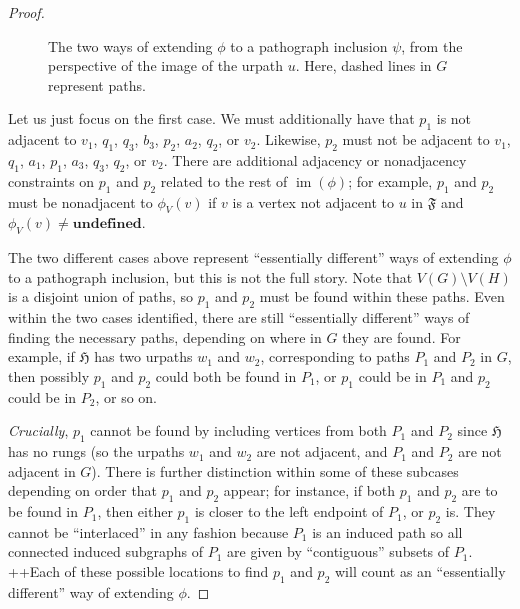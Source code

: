 \documentclass{article}
\newcommand{\alabvert}[4]{\node[dot, label={[label distance=-2pt] #4:{$#3$}}] (#1) at (#2) {};}
\newcommand{\labdotedge}[4]{\draw[dashed] (#1) -- node[midway, #4] {$#3$} (#2);}
\newcommand{\Ff}{\mathfrak{F}}
\newcommand{\Hf}{\mathfrak{H}}
\newcommand{\ud}{\mathbf{undefined}}
\DeclareMathOperator{\im}{im}
\begin{document}
\begin{proof}
\begin{figure}[htbp!]
    \caption{The two ways of extending $\phi$ to a pathograph inclusion $\psi$, from the perspective of the image of the urpath $u$. Here, dashed lines in $G$ represent paths.}
    \label{fig:partialpath}
\end{figure}

Let us just focus on the first case. We must additionally have that $p_1$ is not adjacent to $v_1$, $q_1$, $q_3$, $b_3$, $p_2$, $a_2$, $q_2$, or $v_2$. Likewise, $p_2$ must not be adjacent to $v_1$, $q_1$, $a_1$, $p_1$, $a_3$, $q_3$, $q_2$, or $v_2$. There are additional adjacency or nonadjacency constraints on $p_1$ and $p_2$ related to the rest of $\im(\phi)$; for example, $p_1$ and $p_2$ must be nonadjacent to $\phi_V(v)$ if $v$ is a vertex not adjacent to $u$ in $\Ff$ and $\phi_V(v)\ne\ud$.

The two different cases above represent ``essentially different'' ways of extending $\phi$ to a pathograph inclusion, but this is not the full story. Note that $V(G)\setminus V(H)$ is a disjoint union of paths, so $p_1$ and $p_2$ must be found within these paths. Even within the two cases identified, there are still ``essentially different'' ways of finding the necessary paths, depending on where in $G$ they are found. For example, if $\Hf$ has two urpaths $w_1$ and $w_2$, corresponding to paths $P_1$ and $P_2$ in $G$, then possibly $p_1$ and $p_2$ could both be found in $P_1$, or $p_1$ could be in $P_1$ and $p_2$ could be in $P_2$, or so on.

\textit{Crucially}, $p_1$ cannot be found by including vertices from both $P_1$ and $P_2$ since $\Hf$ has no rungs (so the urpaths $w_1$ and $w_2$ are not adjacent, and $P_1$ and $P_2$ are not adjacent in $G$). There is further distinction within some of these subcases depending on order that $p_1$ and $p_2$ appear; for instance, if both $p_1$ and $p_2$ are to be found in $P_1$, then either $p_1$ is closer to the left endpoint of $P_1$, or $p_2$ is. They cannot be ``interlaced'' in any fashion because $P_1$ is an induced path so all connected induced subgraphs of $P_1$ are given by ``contiguous'' subsets of $P_1$. ++Each of these possible locations to find $p_1$ and $p_2$ will count as an ``essentially different'' way of extending $\phi$.


\end{proof}
\end{document}
